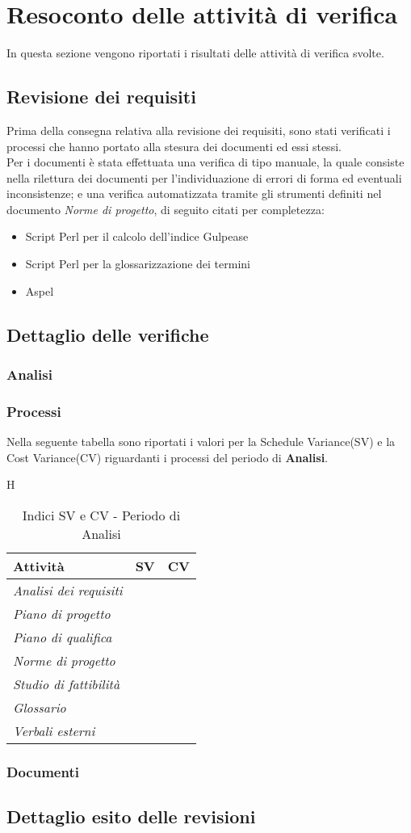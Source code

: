 \section{Resoconto delle attività di verifica}
  In questa sezione vengono riportati i risultati delle attività di verifica svolte.
  \subsection{Revisione dei requisiti}
  Prima della consegna relativa alla revisione dei requisiti, sono stati verificati i processi che hanno portato alla stesura dei documenti ed essi stessi. \\
  Per i documenti è stata effettuata una verifica di tipo manuale, la quale consiste nella rilettura dei documenti per l'individuazione di errori di forma ed eventuali inconsistenze;
  e una verifica automatizzata tramite gli strumenti definiti nel documento \emph{Norme di progetto}, di seguito citati per completezza:
  \begin{itemize}
    \item Script Perl per il calcolo dell’indice Gulpease
    \item Script Perl per la glossarizzazione dei termini
    \item Aspel
  \end{itemize}
  \subsection{Dettaglio delle verifiche}
    \subsubsection{Analisi}
      \subsubsection{Processi}
      Nella seguente tabella sono riportati i valori per la Schedule Variance(SV) e la Cost Variance(CV) riguardanti i processi del periodo di \textbf{Analisi}.
      \begin{table}{H}
        \begin{tabular}{|l|l|l|}
          \hline
          \textbf{Attività} &\textbf{SV}  &\textbf{CV} \\
          \hline
          \emph{Analisi dei requisiti}  \\
          \hline
          \emph{Piano di progetto}  \\
          \hline
          \emph{Piano di qualifica} \\
          \hline
          \emph{Norme di progetto}  \\
          \hline
          \emph{Studio di fattibilità}    \\
          \hline
          \emph{Glossario}  \\
          \hline
          \emph{Verbali esterni}  \\
          \hline
        \end{tabular}
        \caption{Indici SV e CV - Periodo di Analisi}
      \end{table}
      \subsubsection{Documenti}
  \subsection{Dettaglio esito delle revisioni}
